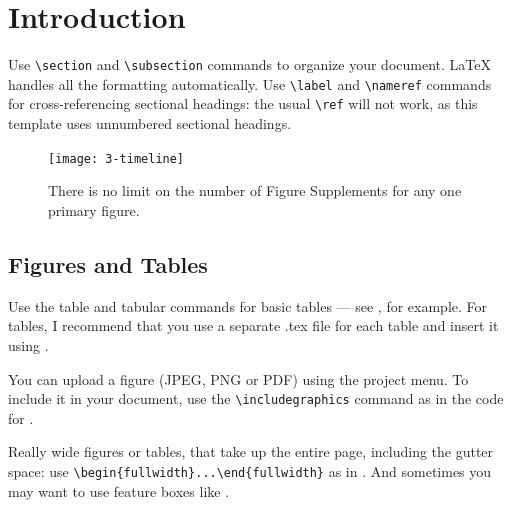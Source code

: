 \section{Introduction} \label{intro}
Use \verb|\section| and \verb|\subsection| commands to organize your document. \LaTeX{} handles all the formatting automatically. Use \verb|\label| and \verb|\nameref| commands for cross-referencing sectional headings: the usual \verb|\ref| will not work, as this template uses unnumbered sectional headings. \par
\lipsum[1]

\begin{figure}
\begin{fullwidth}
    \texttt{[image: 3-timeline]}
\caption{There is no limit on the number of Figure Supplements for any one primary figure.}
 \end{fullwidth}
\end{figure}

\begin{multicols}{2}
\lipsum[2]



\subsection{Figures and Tables}
Use the table and tabular commands for basic tables --- see , for example. For tables, I recommend that you use a separate .tex file for each table and insert it using \verb||.

You can upload a figure (JPEG, PNG or PDF) using the project menu. To include it in your document, use the \verb|\includegraphics| command as in the code for . 

Really wide figures or tables, that take up the entire page, including the gutter space: use \verb|\begin{fullwidth}...\end{fullwidth}| as in . And sometimes you may want to use feature boxes like .

\end{multicols}

